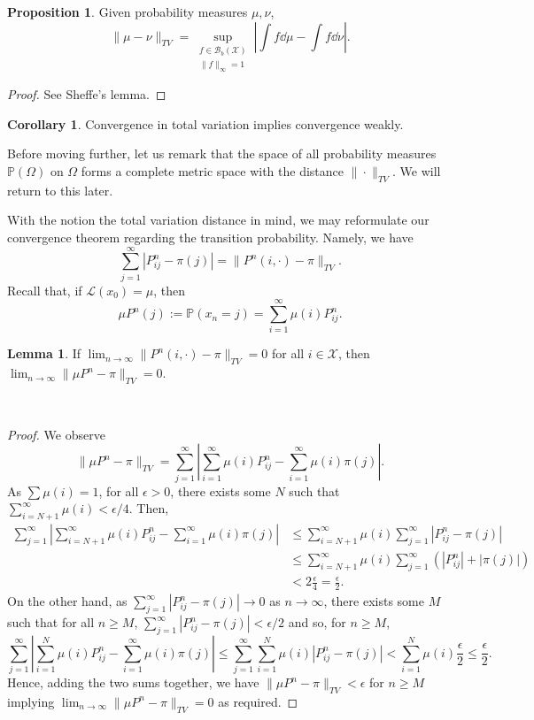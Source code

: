 \documentclass[]{article}
\theoremstyle{definition}
\newtheorem{corollary}{Corollary}[theorem]
\theoremstyle{definition}
\newtheorem{lemma}{Lemma}[section]
\newtheorem{proposition}{Proposition}[section]
\begin{document}
\begin{proposition}
  Given probability measures \(\mu, \nu\), 
  \[\|\mu - \nu\|_{TV} = 
  \sup_{\substack{f \in \mathcal{B}_b(\mathcal{X})\\\|f\|_\infty = 1}}
  \left|\int f\dd\mu - \int f \dd \nu\right|.\]
\end{proposition}
\begin{proof}
  See Sheffe's lemma.
\end{proof}

\begin{corollary}
  Convergence in total variation implies convergence weakly.
\end{corollary}

Before moving further, let us remark that the space of all probability 
measures \(\mathbb{P}(\Omega)\) on \(\Omega\) forms a complete metric space 
with the distance \(\|\cdot\|_{TV}\). We will return to this later.

With the notion the total variation distance in mind, we may reformulate our 
convergence theorem regarding the transition probability. Namely, we have 
\[\sum_{j = 1}^\infty |P^n_{ij} - \pi(j)| = \|P^n(i, \cdot) - \pi\|_{TV}.\]
Recall that, if \(\mathcal{L}(x_0) = \mu\), then 
\[\mu P^n(j) := \mathbb{P}(x_n = j) = \sum_{i = 1}^\infty \mu(i)P^n_{ij}.\]

\begin{lemma}
  If \(\lim_{n \to \infty} \|P^n(i, \cdot) - \pi\|_{TV} = 0\) for all 
  \(i \in \mathcal{X}\), then \(\lim_{n \to \infty}\|\mu P^n - \pi\|_{TV} = 0\).
\end{lemma}\
\begin{proof}
  We observe 
  \[\|\mu P^n - \pi\|_{TV} = 
    \sum_{j = 1}^\infty \left|\sum_{i = 1}^\infty 
    \mu(i)P^n_{ij} - \sum_{i = 1}^\infty \mu(i)\pi(j)\right|.\]
  As \(\sum \mu(i) = 1\), for all \(\epsilon > 0\), there exists some 
  \(N\) such that \(\sum_{i = N + 1}^\infty \mu(i) < \epsilon / 4\). Then, 
  \[\begin{split}
    \sum_{j = 1}^\infty \left|\sum_{i = N + 1}^\infty 
    \mu(i)P^n_{ij} - \sum_{i = 1}^\infty \mu(i)\pi(j)\right|
    & \le \sum_{i = N + 1}^\infty \mu(i) \sum_{j = 1}^\infty |P^n_{ij} - \pi(j)|\\
    & \le \sum_{i = N + 1}^\infty \mu(i) \sum_{j = 1}^\infty (|P^n_{ij}| + |\pi(j)|)\\
    & < 2 \frac{\epsilon}{4} = \frac{\epsilon}{2}.
  \end{split}\]
  On the other hand, as \(\sum_{j = 1}^\infty |P^n_{ij} - \pi(j)| \to 0\) as 
  \(n \to \infty\), there exists some \(M\) such that for all \(n \ge M\),
  \(\sum_{j = 1}^\infty |P^n_{ij} - \pi(j)| < \epsilon / 2\) and so, for \(n \ge M\), 
  \[\sum_{j = 1}^\infty \left|\sum_{i = 1}^N 
  \mu(i)P^n_{ij} - \sum_{i = 1}^\infty \mu(i)\pi(j)\right| 
  \le \sum_{j = 1}^\infty \sum_{i = 1}^N \mu(i)|P^n_{ij} - \pi(j)| < \sum_{i = 1}^N \mu(i)\frac{\epsilon}{2} 
  \le \frac{\epsilon}{2}.\]
  Hence, adding the two sums together, we have \(\|\mu P^n - \pi\|_{TV} < \epsilon\) 
  for \(n \ge M\) implying \(\lim_{n \to \infty}\|\mu P^n - \pi\|_{TV} = 0\) as 
  required.
\end{proof}
\end{document}

